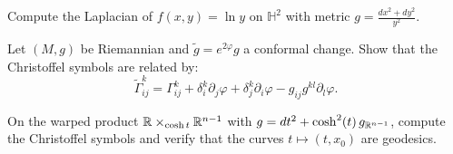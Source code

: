 \begin{exercise}
Compute the Laplacian of $f(x,y) = \ln y$ on $\mathbb{H}^2$ with metric
$g = \frac{dx^2 + dy^2}{y^2}$.
\end{exercise}

\begin{exercise}
Let $(M, g)$ be Riemannian and $\tilde{g} = e^{2\varphi} g$ a conformal change.
Show that the Christoffel symbols are related by:
\[
    \tilde{\Gamma}^k_{ij} = \Gamma^k_{ij} + \delta^k_i \partial_j \varphi
    + \delta^k_j \partial_i \varphi - g_{ij} g^{kl} \partial_l \varphi.
\]
\end{exercise}

\begin{exercise}
On the warped product $\mathbb{R} \times_{\cosh t} \mathbb{R}^{n-1}$ with
$g = dt^2 + \cosh^2(t)\, g_{\mathbb{R}^{n-1}}$, compute the Christoffel symbols
and verify that the curves $t \mapsto (t, x_0)$ are geodesics.
\end{exercise}
